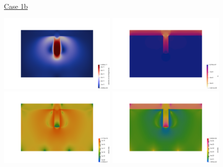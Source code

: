 \newpage
\underline{Case 1b}

\begin{center}
\includegraphics[width=5.7cm]{python_codes/fieldstone_87/results/experiment_04/100x66/vel.png}
\includegraphics[width=5.7cm]{python_codes/fieldstone_87/results/experiment_04/100x66/p.png}\\
\includegraphics[width=5.7cm]{python_codes/fieldstone_87/results/experiment_04/100x66/sr.png}
\includegraphics[width=5.7cm]{python_codes/fieldstone_87/results/experiment_04/100x66/eta.png}
\end{center}

